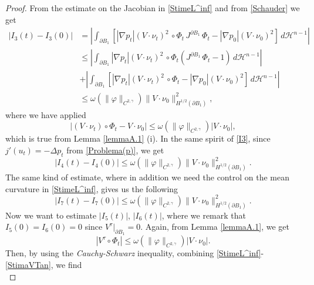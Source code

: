 \documentclass[oneside,a4paper,11pt,notitlepage]{article}
\newcommand{\abs}[1]{{\left|#1\right|}}
\theoremstyle{definition}
\theoremstyle{plain}
\theoremstyle{definition}
\begin{document}
\begin{proof}
    From the estimate on the Jacobian in \eqref{StimeL^inf} and from \eqref{Schauder} we get
    \begin{equation}\label{I3}
        \begin{split}
            |I_3(t)-I_3(0)|&=\left|\int_{\partial B_1} \left[\abs{\nabla p_t}(V\cdot\nu_t)^2\,\circ\Phi_t\,J^{\partial B_1}\,\Phi_t-\abs{\nabla p_0}(V\cdot\nu_0)^2 \right]\,d\mathcal{H}^{n-1} \right|\\
            &\leq\left|\int_{\partial B_1}\abs{\nabla p_t}(V\cdot\nu_t)^2\,\circ\Phi_t\left(J^{\partial B_1}\,\Phi_t-1 \right)\,d\mathcal{H}^{n-1}\right|\\
            &+\left|\int_{\partial B_1}\left[\abs{\nabla p_t}(V\cdot\nu_t)^2\,\circ\Phi_t -\abs{\nabla p_0}(V\cdot\nu_0)^2\right]\,d\mathcal{H}^{n-1} \right| \\
            &\leq \omega(\|\varphi\|_{C^{2,\gamma}})\|V\cdot\nu_0\|_{H^{1/2}(\partial B_1)}^2,
        \end{split}
    \end{equation}
    where we have applied
    \begin{equation*}
        \left|(V\cdot\nu_t)\circ\Phi_t-V\cdot\nu_0 \right|\leq \omega(\|\varphi\|_{C^{2,\gamma}})\abs{V\cdot\nu_0},
    \end{equation*}
    which is true from Lemma \ref{lemmaA.1} (i). In the same spirit of \eqref{I3}, since $j'(u_t)=-\Delta p_t$ from \eqref{Problema(p)}, we get
    \begin{equation*}
        \abs{I_4(t)-I_4(0)}\leq \omega(\|\varphi\|_{C^{2,\gamma}})\|V\cdot\nu_0\|_{H^{1/2}(\partial B_1)}^2.
    \end{equation*}
    The same kind of estimate, where in addition we need the control on the mean curvature in \eqref{StimeL^inf}, gives us the following
    \begin{equation*}
        \abs{I_7(t)-I_7(0)}\leq \omega(\|\varphi\|_{C^{2,\gamma}})\|V\cdot\nu_0\|_{H^{1/2}(\partial B_1)}^2.
    \end{equation*}
    Now we want to estimate $|I_5(t)|$, $|I_6(t)|$, where we remark that $I_5(0)=I_6(0)=0$ since $V^\tau|_{\partial B_1}=0$. Again, from Lemma \ref{lemmaA.1}, we get
    \begin{equation}\label{StimaVTan}
        \abs{V^\tau\circ\Phi_t}\leq\omega(\|\varphi\|_{C^{2,\gamma}})\abs{V\cdot\nu_0}.
    \end{equation}
    Then, by using the \emph{Cauchy-Schwarz} inequality, combining \eqref{StimeL^inf}-\eqref{StimaVTan}, we find
    \begin{equation*}

\end{equation*}
\end{proof}
\end{document}

